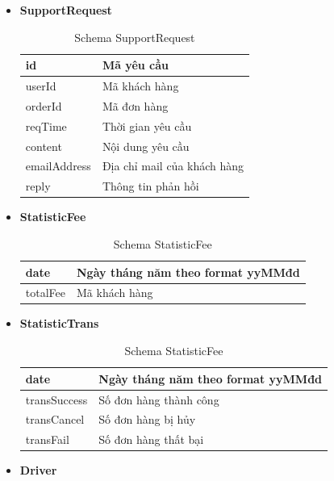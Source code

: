 \begin{itemize}
	
		\item \textbf{SupportRequest}
		
		\begin{table}[H]
			\centering\begin{tabular}{|l|m{30em}|}
				\hline 
				id & Mã yêu cầu\\
				\hline 
				userId & Mã khách hàng\\
				\hline 
				orderId & Mã đơn hàng\\ 
				\hline
				reqTime & Thời gian yêu cầu \\
				\hline 
				content & Nội dung yêu cầu \\
				\hline
				emailAddress & Địa chỉ mail của khách hàng \\
				\hline
				reply & Thông tin phản hồi \\
				\hline
			\end{tabular}
			\caption{Schema SupportRequest}
		\end{table}
	
		\item \textbf{StatisticFee}
		
		\begin{table}[H]
			\centering\begin{tabular}{|l|m{30em}|}
				\hline 
				date & Ngày tháng năm theo format yyMMđd\\
				\hline 
				totalFee & Mã khách hàng\\
				\hline 
			\end{tabular}
			\caption{Schema StatisticFee}
		\end{table}
	
	
		\item \textbf{StatisticTrans}
		
		\begin{table}[H]
			\centering\begin{tabular}{|l|m{30em}|}
				\hline 
				date & Ngày tháng năm theo format yyMMđd\\
				\hline 
				transSuccess & Số đơn hàng thành công\\
				\hline 
				transCancel & Số đơn hàng bị hủy\\
				\hline 
				transFail & Số đơn hàng thất bại\\
				\hline 
			\end{tabular}
			\caption{Schema StatisticFee}
		\end{table}
	
	\newpage
	
		\item \textbf{Driver}
		

\end{itemize}

